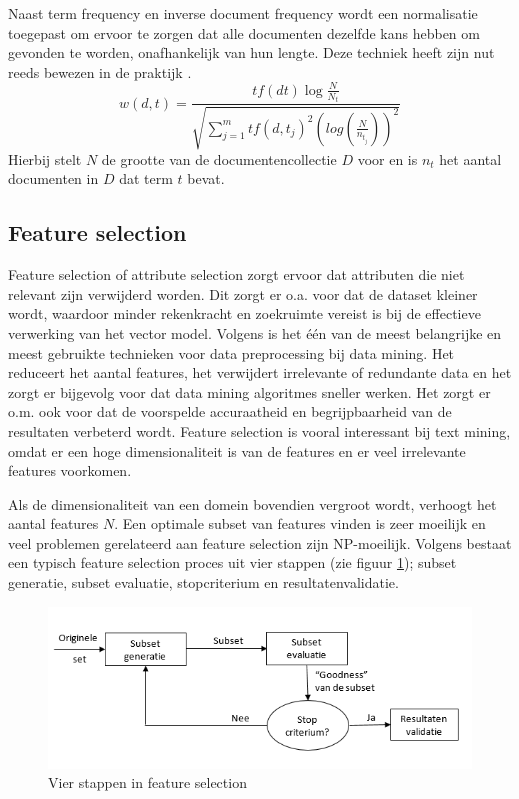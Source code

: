Naast term frequency en inverse document frequency wordt een normalisatie toegepast om ervoor te zorgen dat alle documenten dezelfde kans hebben om gevonden te worden, onafhankelijk van hun lengte. Deze techniek heeft zijn nut reeds bewezen in de praktijk . 
\begin{equation}\label{eq:tfidf}
w(d,t) = \frac{tf(dt)\log{\frac{N}{N_t}}}{\sqrt{\sum_{j=1}^{m}tf(d,t_j)^2(log(\frac{N}{n_{t_j}}))^2}}
\end{equation}
Hierbij stelt $N$ de grootte van de documentencollectie $D$ voor en is $n_t$ het aantal documenten in $D$ dat term $t$ bevat.

\subsection{Feature selection}
Feature selection of attribute selection zorgt ervoor dat attributen die niet relevant zijn verwijderd worden. Dit zorgt er o.a. voor dat de dataset kleiner wordt, waardoor minder rekenkracht en zoekruimte vereist is bij de effectieve verwerking van het vector model. Volgens \cite{Liu2005} is het \'e\'en van de meest belangrijke en meest gebruikte technieken voor data preprocessing bij data mining. Het reduceert het aantal features, het verwijdert irrelevante of redundante data en het zorgt er bijgevolg voor dat data mining algoritmes sneller werken. Het zorgt er o.m. ook voor dat de voorspelde accuraatheid en begrijpbaarheid van de resultaten verbeterd wordt. Feature selection is vooral interessant bij text mining, omdat er een hoge dimensionaliteit is van de features en er veel irrelevante features voorkomen.

Als de dimensionaliteit van een domein bovendien vergroot wordt, verhoogt het aantal features $N$. Een optimale subset van features vinden is zeer moeilijk en veel problemen gerelateerd aan feature selection zijn NP-moeilijk. Volgens \cite{Liu2005} bestaat een typisch feature selection proces uit vier stappen (zie figuur \ref{fig:feature-selection}); subset generatie, subset evaluatie, stopcriterium en resultatenvalidatie.

\begin{figure}[h]
	\caption{Vier stappen in feature selection}
	\label{fig:feature-selection}
	\includegraphics[width=\textwidth]{fig/feature-selection}
\end{figure}

